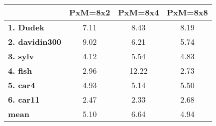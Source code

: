 \begin{tabular}{|l|c|c|c|}
\hline
&\textbf{PxM=8x2}&\textbf{PxM=8x4}&\textbf{PxM=8x8}\\\hline
\textbf{1. Dudek}&7.11&8.43&8.19\\\hline
\textbf{2. davidin300}&9.02&6.21&5.74\\\hline
\textbf{3. sylv}&4.12&5.54&4.83\\\hline
\textbf{4. fish}&2.96&12.22&2.73\\\hline
\textbf{5. car4}&4.93&5.14&5.50\\\hline
\textbf{6. car11}&2.47&2.33&2.68\\\hline
\textbf{mean}&5.10&6.64&4.94\\\hline
\end{tabular}
